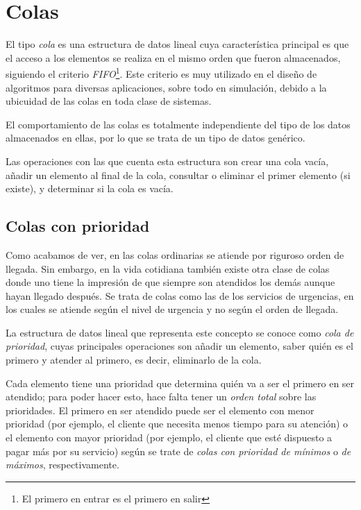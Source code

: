 \section{Colas}
El tipo \textit{cola} es una estructura de datos lineal cuya característica principal es que el acceso a los elementos se realiza en el mismo orden que fueron almacenados, siguiendo el criterio \textit{FIFO}\footnote{El primero en entrar es el primero en salir}. Este criterio es muy utilizado en el diseño de algoritmos para diversas aplicaciones, sobre todo en simulación, debido a la ubicuidad de las colas en toda clase de sistemas.\newline 

El comportamiento de las colas es totalmente independiente del tipo de los datos almacenados en ellas, por lo que se trata de un tipo de datos genérico.

Las operaciones con las que cuenta esta estructura son crear una cola vacía, añadir un elemento al final de la cola, consultar o eliminar el primer elemento (si existe), y determinar si la cola es vacía.

\subsection{Colas con prioridad}
Como acabamos de ver, en las colas ordinarias se atiende por riguroso orden de llegada. Sin embargo, en la vida cotidiana también existe otra clase de colas donde uno tiene la impresión de que siempre son atendidos los demás aunque hayan llegado después. Se trata de colas como las de los servicios de urgencias, en los cuales se atiende según el nivel de urgencia y no según el orden de llegada.\newline

La estructura de datos lineal que representa este concepto se conoce como \textit{cola de prioridad}, cuyas principales operaciones son añadir un elemento, saber quién es el primero y atender al primero, es decir, eliminarlo de la cola.\newline

Cada elemento tiene una prioridad que determina quién va a ser el primero en ser atendido; para poder hacer esto, hace falta tener un \textit{orden total} sobre las prioridades. El primero en ser atendido puede ser el elemento con menor prioridad (por ejemplo, el cliente que necesita menos tiempo para su atención) o el elemento con mayor prioridad (por ejemplo, el cliente que esté dispuesto a pagar más por su servicio) según se trate de \textit{colas con prioridad de mínimos} o \textit{de máximos}, respectivamente.\newline

